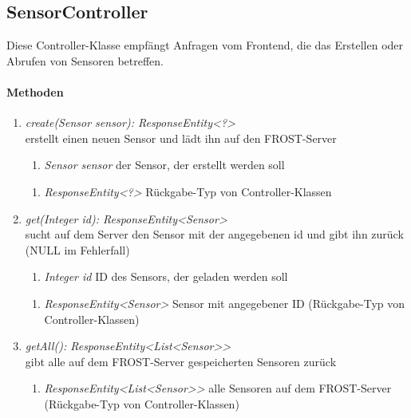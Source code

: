 \subsection{SensorController}
Diese Controller-Klasse empfängt Anfragen vom Frontend, die das Erstellen oder Abrufen von Sensoren betreffen.

\paragraph{Methoden}

\begin{enumerate}[+]
	\item \textit{ create(Sensor sensor): ResponseEntity<?> }\\
	erstellt einen neuen Sensor und lädt ihn auf den FROST-Server
	
	\begin{enumerate}[$\bullet$]
		\item \textit{Sensor sensor} der Sensor, der erstellt werden soll
		
	\end{enumerate}
	\vspace{-0.2cm}
	\begin{enumerate}[$\circ$]
		\item \textit{ResponseEntity<?>} Rückgabe-Typ von Controller-Klassen
	\end{enumerate}
	
	\item \textit{ get(Integer id): ResponseEntity<Sensor> }\\
	sucht auf dem Server den Sensor mit der angegebenen id und gibt ihn zurück (NULL im Fehlerfall)
	
	\begin{enumerate}[$\bullet$]
		\item \textit{Integer id} ID des Sensors, der geladen werden soll
		
	\end{enumerate}
	\vspace{-0.2cm}
	\begin{enumerate}[$\circ$]
		\item \textit{ResponseEntity<Sensor>} Sensor mit angegebener ID (Rückgabe-Typ von Controller-Klassen)
	\end{enumerate}
	\item \textit{ getAll(): ResponseEntity<List<Sensor>> }\\
	gibt alle auf dem FROST-Server gespeicherten Sensoren zurück
	
	\begin{enumerate}[$\circ$]
		\item \textit{ResponseEntity<List<Sensor>>} alle Sensoren auf dem FROST-Server (Rückgabe-Typ von Controller-Klassen)
	\end{enumerate}
	
	
\end{enumerate}